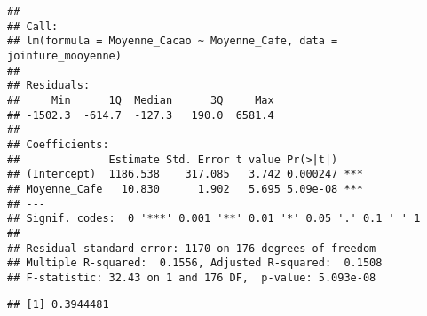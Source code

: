 \documentclass[
]{article}
\newenvironment{Shaded}{\begin{snugshade}}{\end{snugshade}}
\newcommand{\AttributeTok}[1]{\textcolor[rgb]{0.13,0.29,0.53}{#1}}
\newcommand{\FunctionTok}[1]{\textcolor[rgb]{0.13,0.29,0.53}{\textbf{#1}}}
\newcommand{\NormalTok}[1]{#1}
\newcommand{\SpecialCharTok}[1]{\textcolor[rgb]{0.81,0.36,0.00}{\textbf{#1}}}
\newcommand{\StringTok}[1]{\textcolor[rgb]{0.31,0.60,0.02}{#1}}
\begin{document}
\begin{verbatim}
## 
## Call:
## lm(formula = Moyenne_Cacao ~ Moyenne_Cafe, data = jointure_mooyenne)
## 
## Residuals:
##     Min      1Q  Median      3Q     Max 
## -1502.3  -614.7  -127.3   190.0  6581.4 
## 
## Coefficients:
##              Estimate Std. Error t value Pr(>|t|)    
## (Intercept)  1186.538    317.085   3.742 0.000247 ***
## Moyenne_Cafe   10.830      1.902   5.695 5.09e-08 ***
## ---
## Signif. codes:  0 '***' 0.001 '**' 0.01 '*' 0.05 '.' 0.1 ' ' 1
## 
## Residual standard error: 1170 on 176 degrees of freedom
## Multiple R-squared:  0.1556, Adjusted R-squared:  0.1508 
## F-statistic: 32.43 on 1 and 176 DF,  p-value: 5.093e-08
\end{verbatim}

\begin{Shaded}
\end{Shaded}

\begin{verbatim}
## [1] 0.3944481
\end{verbatim}
\end{document}
